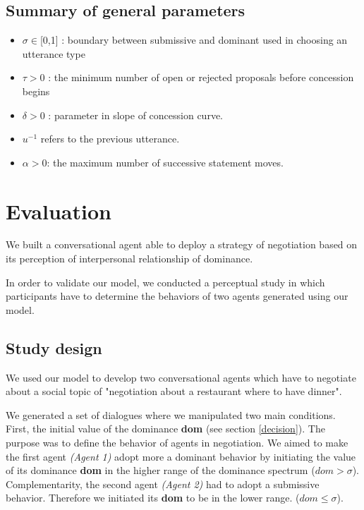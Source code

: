 \documentclass{llncs}
\begin{document}
	\subsection{Summary of general parameters }
	\begin{itemize}[noitemsep]
	
	\item $\sigma \in $[0,1] : boundary between submissive and dominant used in
	choosing an utterance type
	\item $\tau > 0$ : the minimum number of open or rejected proposals before concession begins
	\item $\delta > 0$ : parameter in slope of concession curve.
	\item $u^{-1}$ refers to the previous utterance.
	\item $\alpha> 0$: the maximum number of successive statement moves.
	
	
	\end{itemize}
	
	
	
	\section{Evaluation}
	
	We built a conversational agent able to deploy a strategy of negotiation based on its perception of interpersonal relationship of dominance. 
	
	In order to validate our model, we conducted a perceptual study in which participants have to determine the behaviors of two agents generated using our model. 
	
	\subsection{Study design}
	We used our model to develop two conversational agents which have to negotiate about a social topic of "negotiation about a restaurant where to have dinner".
	
	We generated a set of dialogues where we manipulated two main conditions. First, the initial value of the dominance \textbf{dom} (see section \ref{decision}). The purpose was to define the behavior of agents in negotiation.
	We aimed to make the first agent \emph{(Agent 1)} adopt more a dominant behavior by initiating the value of its dominance \textbf{dom} in the higher range of the dominance spectrum ($dom>\sigma$). Complementarity, the second agent \emph{(Agent 2)} had to adopt a submissive behavior. Therefore we initiated its \textbf{dom} to be in the lower range. ($ dom\leq \sigma$).
	
\end{document}
